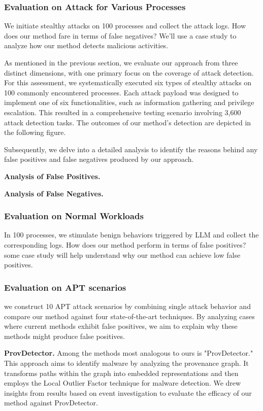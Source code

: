 \subsubsection{Evaluation on Attack for Various Processes}
We initiate stealthy attacks on 100 processes and collect the attack logs. How does our method fare in terms of false negatives? We'll use a case study to analyze how our method detects malicious activities.

As mentioned in the previous section, we evaluate our approach from three distinct dimensions, with one primary focus on the coverage of attack detection. For this assessment, we systematically executed six types of stealthy attacks on 100 commonly encountered processes. Each attack payload was designed to implement one of six functionalities, such as information gathering and privilege escalation. This resulted in a comprehensive testing scenario involving 3,600 attack detection tasks. The outcomes of our method's detection are depicted in the following figure.

Subsequently, we delve into a detailed analysis to identify the reasons behind any false positives and false negatives produced by our approach.

\textbf{Analysis of False Positives.}

\textbf{Analysis of False Negatives.}

\subsubsection{Evaluation on Normal Workloads}
In 100 processes, we stimulate benign behaviors triggered by LLM and collect the corresponding logs. How does our method perform in terms of false positives? some case study will help understand why our method can achieve low false positives.

\subsubsection{Evaluation on APT scenarios}
we construct 10 APT attack scenarios by combining single attack behavior and compare our method against four state-of-the-art techniques. By analyzing cases where current methods exhibit false positives, we aim to explain why these methods might produce false positives.

\textbf{ProvDetector.}
Among the methods most analogous to ours is "ProvDetector." 
This approach \cite{wang2020you} aims to identify malware by analyzing the provenance graph. It transforms paths within the graph into embedded representations and then employs the Local Outlier Factor technique for malware detection.
We drew insights from results based on event investigation to evaluate the efficacy of our method against ProvDetector.

